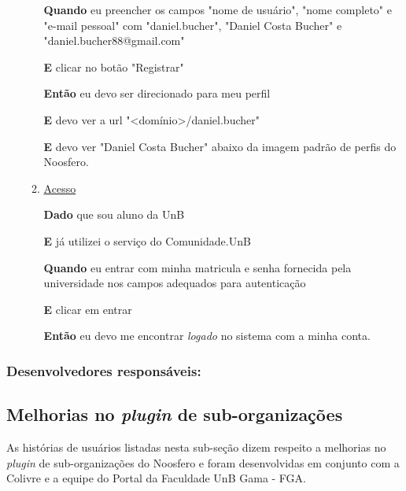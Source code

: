 \begin{enumerate}
\begin{enumerate}
\textbf{Quando} eu preencher os campos "nome de usuário",
"nome completo" e "e-mail pessoal" com "daniel.bucher", "Daniel Costa Bucher" e
"daniel.bucher88@gmail.com"

\textbf{E} clicar no botão "Registrar"

\textbf{Então} eu devo ser direcionado para meu perfil

\textbf{E} devo ver a url "<domínio>/daniel.bucher"

\textbf{E} devo ver "Daniel Costa Bucher" abaixo da imagem padrão de perfis
do Noosfero.


\item \underline{Acesso}

\textbf{Dado} que sou aluno da UnB

\textbf{E} já utilizei o serviço do Comunidade.UnB

\textbf{Quando} eu entrar com minha matricula e senha fornecida pela universidade
nos campos adequados para autenticação

\textbf{E} clicar em entrar

\textbf{Então} eu devo me encontrar \textit{logado} no sistema com a minha conta.

\end{enumerate}

\end{enumerate}

\subsubsection*{Desenvolvedores responsáveis:}




\subsection{Melhorias no \textit{plugin} de sub-organizações}

As histórias de usuários listadas nesta sub-seção dizem respeito a melhorias
no \textit{plugin} de sub-organizações do Noosfero e foram desenvolvidas em
conjunto com a Colivre e a equipe do Portal da Faculdade UnB Gama - FGA.

